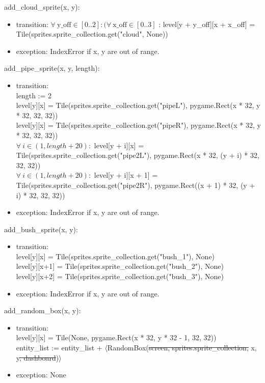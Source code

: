 \documentclass[12pt]{article}
\begin{document}
add\_cloud\_sprite(x, y):
\begin{itemize}
    \item transition: $\forall\ \text{y\_off} \in [0 .. 2] : (\forall\ \text{x\_off} \in [0 .. 3]$ : level[y + y\_off][x + x\_off] = Tile(sprites.sprite\_collection.get("cloud", None))
    \item exception: IndexError if x, y are out of range.
\end{itemize}

add\_pipe\_sprite(x, y, length):
\begin{itemize}
    \item transition:\\ length := 2\\
    level[y][x] = Tile(sprites.sprite\_collection.get("pipeL"), pygame.Rect(x * 32, y * 32, 32, 32))\\
    level[y][x] = Tile(sprites.sprite\_collection.get("pipeR"), pygame.Rect(x * 32, y * 32, 32, 32))\\
    $\forall\ i \in (1, length + 20) : $ level[y + i][x] = Tile(sprites.sprite\_collection.get("pipe2L"), pygame.Rect(x * 32, (y + i) * 32, 32, 32))\\
    $\forall\ i \in (1, length + 20) : $ level[y + i][x + 1] = Tile(sprites.sprite\_collection.get("pipe2R"), pygame.Rect((x + 1) * 32, (y + i) * 32, 32, 32))\\
    \item exception: IndexError if x, y are out of range.
\end{itemize}

add\_bush\_sprite(x, y):
\begin{itemize}
    \item transition: \\
    level[y][x] = Tile(sprites.sprite\_collection.get("bush\_1"), None)\\
    level[y][x+1] = Tile(sprites.sprite\_collection.get("bush\_2"), None)\\
    level[y][x+2] = Tile(sprites.sprite\_collection.get("bush\_3"), None)\\
    \item exception: IndexError if x, y are out of range.
\end{itemize}

add\_random\_box(x, y):
\begin{itemize}
    \item transition:\\ level[y][x] = Tile(None, pygame.Rect(x * 32, y * 32 - 1, 32, 32))\\
    entity\_list := entity\_list + $\langle$RandomBox(\st{screen, sprites.sprite\_collection,} x, y\st{, dashboard})$\rangle$
    \item exception: None
\end{itemize}
\end{document}
